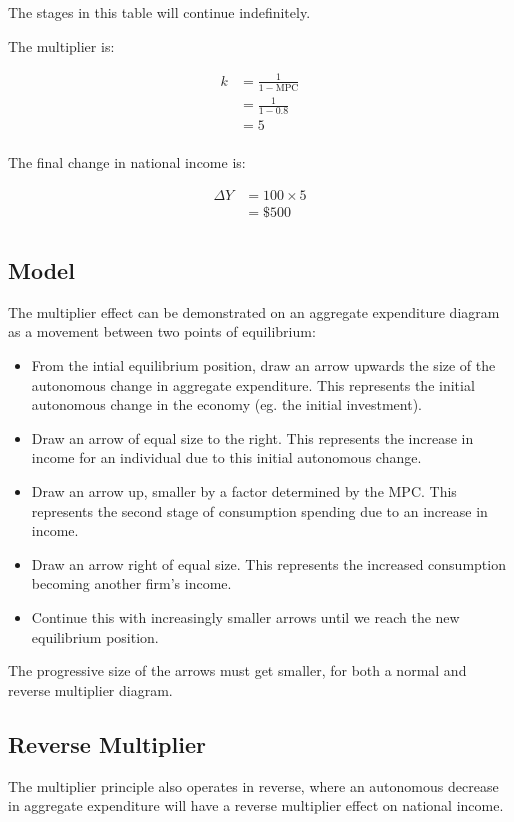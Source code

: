 \documentclass[a4paper,11pt]{article}
\begin{document}
The stages in this table will continue indefinitely.

The multiplier is:

$$
\begin{aligned}
k & = \frac{1}{1 - \mbox{MPC}} \\
& = \frac{1}{1 - 0.8} \\
& = 5 \\
\end{aligned}
$$

The final change in national income is:

$$
\begin{aligned}
\Delta Y & = 100 \times 5 \\
& = \$500 \\
\end{aligned}
$$


\subsection{Model}


The multiplier effect can be demonstrated on an aggregate expenditure diagram
as a movement between two points of equilibrium:

\begin{itemize}
\item From the intial equilibrium position, draw an arrow upwards the size of
	the autonomous change in aggregate expenditure. This represents the initial
	autonomous change in the economy (eg. the initial investment).
\item Draw an arrow of equal size to the right. This represents the increase in
	income for an individual due to this initial autonomous change.
\item Draw an arrow up, smaller by a factor determined by the MPC. This
	represents the second stage of consumption spending due to an increase in
	income.
\item Draw an arrow right of equal size. This represents the increased
	consumption becoming another firm's income.
\item Continue this with increasingly smaller arrows until we reach the new
	equilibrium position.
\end{itemize}

The progressive size of the arrows must get smaller, for both a normal and
reverse multiplier diagram.


\subsection{Reverse Multiplier}

The multiplier principle also operates in reverse, where an autonomous decrease
in aggregate expenditure will have a reverse multiplier effect on national
income.
\end{document}
